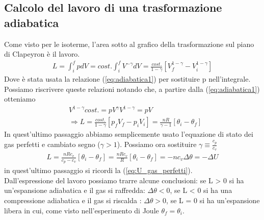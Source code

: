 \documentclass[10pt,a4paper]{article}
\begin{document}
\subsection{Calcolo del lavoro di una trasformazione adiabatica}
Come visto per le isoterme, l'area sotto al grafico della trasformazione sul piano di Clapeyron è il lavoro. 
\begin{align*}
	L = \int_{i}^{f} p dV = cost. \int_{i}^{f} V^{-\gamma} dV = \frac{cost.}{1 - \gamma}[V_f^{1-\gamma}-V_i^{1-\gamma}]
\end{align*}
Dove è stata usata la relazione (\ref{eq:adiabatica1}) per sostituire p nell'integrale.\\
Possiamo riscrivere queste relazioni notando che, a partire dalla (\ref{eq:adiabatica1}) otteniamo
\begin{align*}
	&V^{1- \gamma} cost. = pV^{\gamma} V^{1- \gamma} = pV\\
	&\Rightarrow L =  \frac{cost.}{1 - \gamma}[p_f V_f-p_i V_i] = \frac{n R}{\gamma - 1}[\theta_i - \theta_f]
\end{align*}
In quest'ultimo passaggio abbiamo semplicemente usato l'equazione di stato dei gas perfetti e cambiato segno ($\gamma > 1$). Possiamo ora sostituire $\gamma \equiv \frac{c_p}{c_v}$ 
\begin{align*}
L = \frac{n R c_v}{c_p - c_v} [\theta_i - \theta_f] = \frac{n R c_v}{R} [\theta_i - \theta_f] = -n c_v \Delta \theta = -\Delta U
\end{align*}
in quest'ultimo passaggio si ricordi la (\ref{eq:U_gas_perfetti}).\\
Dall'espressione del lavoro possiamo trarre alcune conclusioni: se L > 0 si ha un'espansione adiabatica e il gas si raffredda: \(\Delta \theta< 0\), se L < 0 si ha una compressione adiabatica e il gas si riscalda : \(\Delta \theta > 0\), se L = 0 si ha un'espansione libera in cui, come visto nell'esperimento di Joule \(\theta_f = \theta_i\).
\end{document}
